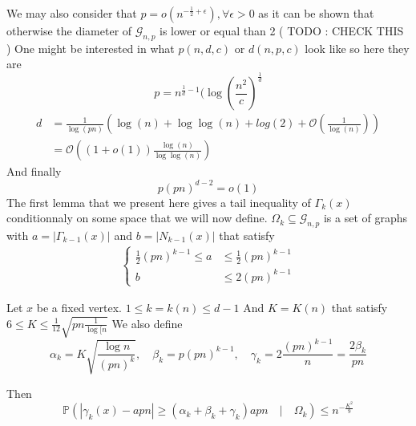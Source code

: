 We may also consider that $p = o(n^{-\frac{1}{2} +\epsilon}), \forall \epsilon > 0$ as it can be shown that otherwise the diameter of $\mathcal{G}_{n,p}$ is lower or equal than 2 ( TODO : CHECK THIS )
One might be interested in what $p(n, d, c)$ or $d(n , p, c)$ look like so here they are
\begin{equation}
	p=n^{\frac{1}{d} - 1}(\log(\frac{n^2}{c})^\frac{1}{d}
\end{equation}
\begin{align}
	d &= \frac{1}{\log(pn)}(\log(n) + \log \log (n) + log(2) + \mathcal{O}(\frac{1}{\log(n)}))\\
	  &= \mathcal{O}((1+o(1))\frac{\log(n)}{\log\log(n)})
\end{align}
And finally
\begin{equation}
	p(pn)^{d-2} = o(1)
\end{equation}
The first lemma that we present here gives a tail inequality of $\Gamma_k(x)$ conditionnaly on some space that we will now define. $\Omega_k \subseteq \mathcal{G}_{n, p}$ is a set of graphs with $a = |\Gamma_{k-1}(x)|$ and $b = |N_{k-1}(x)|$ that satisfy
\begin{align}
 \left\{\begin{array}{rl}
		 \frac{1}{2}(pn)^{k-1} \leq a &\leq \frac{1}{2}(pn)^{k-1} \\
		 			    b &\leq 2(pn)^{k-1}
	 \end{array}
	\right.
\end{align}
\begin{lemma}
	Let $x$ be a fixed vertex.
	\newline
	$1 \leq k = k(n)  \leq d-1$
	\newline
	And $ K = K(n)$ that satisfy $ 6 \leq K \leq \frac{1}{12} \sqrt{pn\frac{1}{\log[n}}$
	We also define
	\begin{equation}
		\alpha_k = K\sqrt{\frac{\log{n}}{(pn)^k}} , \quad \beta_k = p(pn)^{k-1}, \quad \gamma_k = 2\frac{(pn)^{k-1}}{n} = \frac{2\beta_k}{pn}
	\end{equation}

	Then
	\begin{equation}
		\mathbb{P}(|\gamma_k(x) - apn| \geq (\alpha_k + \beta_k + \gamma_k)apn \quad|\quad \Omega_k) \leq n^{-\frac{K^2}{9}}
	\end{equation}
\end{lemma}

